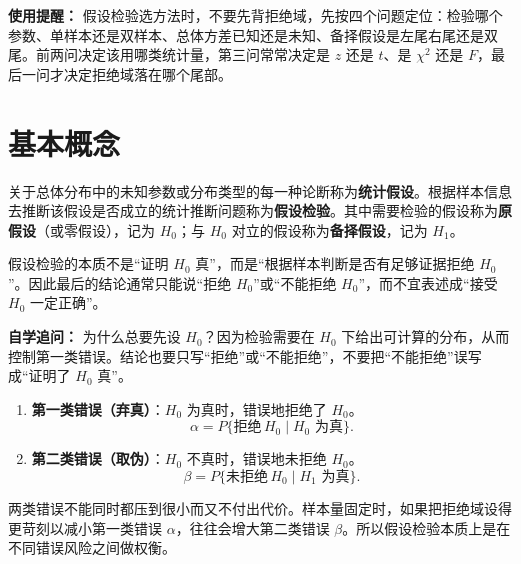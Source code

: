 ﻿\documentclass[lang=cn,11pt]{elegantbook}
\begin{document}
\begin{note}
\textbf{使用提醒：} 假设检验选方法时，不要先背拒绝域，先按四个问题定位：检验哪个参数、单样本还是双样本、总体方差已知还是未知、备择假设是左尾右尾还是双尾。前两问决定该用哪类统计量，第三问常常决定是 \(z\) 还是 \(t\)、是 \(\chi^2\) 还是 \(F\)，最后一问才决定拒绝域落在哪个尾部。
\end{note}

\section{基本概念}

\begin{definition}[假设检验] \label{def:hypothesis-test}
关于总体分布中的未知参数或分布类型的每一种论断称为\textbf{统计假设}。根据样本信息去推断该假设是否成立的统计推断问题称为\textbf{假设检验}。其中需要检验的假设称为\textbf{原假设}（或零假设），记为 \(H_0\)；与 \(H_0\) 对立的假设称为\textbf{备择假设}，记为 \(H_1\)。
\end{definition}

\begin{note}
假设检验的本质不是“证明 \(H_0\) 真”，而是“根据样本判断是否有足够证据拒绝 \(H_0\) ”。因此最后的结论通常只能说“拒绝 \(H_0\)”或“不能拒绝 \(H_0\)”，而不宜表述成“接受 \(H_0\) 一定正确”。
\end{note}

\begin{note}
\textbf{自学追问：} 为什么总要先设 \(H_0\)？因为检验需要在 \(H_0\) 下给出可计算的分布，从而控制第一类错误。结论也要只写“拒绝”或“不能拒绝”，不要把“不能拒绝”误写成“证明了 \(H_0\) 真”。
\end{note}

\begin{definition}[两类错误] \label{def:two-errors}
\begin{enumerate}
    \item \textbf{第一类错误（弃真）}：\(H_0\) 为真时，错误地拒绝了 \(H_0\)。
    \[
    \alpha = P\{\text{拒绝}\, H_0 \mid H_0\text{ 为真}\}.
    \]
    \item \textbf{第二类错误（取伪）}：\(H_0\) 不真时，错误地未拒绝 \(H_0\)。
    \[
    \beta = P\{\text{未拒绝}\, H_0 \mid H_1\text{ 为真}\}.
    \]
\end{enumerate}
\end{definition}

\begin{note}
两类错误不能同时都压到很小而又不付出代价。样本量固定时，如果把拒绝域设得更苛刻以减小第一类错误 \(\alpha\)，往往会增大第二类错误 \(\beta\)。所以假设检验本质上是在不同错误风险之间做权衡。
\end{note}
\end{document}
